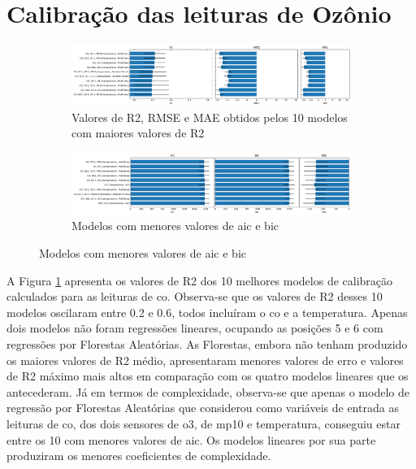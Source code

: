 \section{Calibração das leituras de Ozônio}

\begin{figure}[h!]
    \centering
    \caption{Desempenho dos modelos de regressão aplicados para inferir as leituras de concentração de \acrshort{o3} medidas pela estação de referência}
    \begin{subfigure}{0.9\textwidth}
        \includegraphics[width=\textwidth]{chapters/4-CALIBRAÇÃO MÚLTIPLOS SENSORES/Figuras/o3-all-models-performance.png}
        \caption{Valores de R2, RMSE e MAE obtidos pelos 10 modelos com maiores valores de R2}
        \label{fig:data-o3-all-models-performance}
    \end{subfigure}
    \begin{subfigure}{0.9\textwidth}
        \includegraphics[width=\textwidth]{chapters/4-CALIBRAÇÃO MÚLTIPLOS SENSORES/Figuras/o3-all-models-complexity.png}
        \caption{Modelos com menores valores de \acrshort{aic} e \acrshort{bic}}
        \label{fig:data-o3-all-models-comlexity}
    \end{subfigure}
    \label{fig:data-o3-all-models-performance-comlexity}
\end{figure}

A Figura \ref{fig:data-o3-all-models-performance} apresenta os valores de R2 dos 10 melhores modelos de calibração calculados para as leituras de \acrshort{co}. Observa-se que os valores de R2 desses 10 modelos oscilaram entre 0.2 e 0.6, todos incluíram o \acrshort{co} e a temperatura. Apenas dois modelos não foram regressões lineares, ocupando as posições 5 e 6 com regressões por Florestas Aleatórias. As Florestas, embora não tenham produzido os maiores valores de R2 médio, apresentaram menores valores de erro e valores de R2 máximo mais altos em comparação com os quatro modelos lineares que os antecederam. Já em termos de complexidade, observa-se que apenas o modelo de regressão por Florestas Aleatórias que considerou como variáveis de entrada as leituras de \acrshort{co}, dos dois sensores de \acrshort{o3}, de \acrshort{mp10} e temperatura, conseguiu estar entre os 10 com menores valores de \acrshort{aic}. Os modelos lineares por sua parte produziram os menores coeficientes de complexidade.

